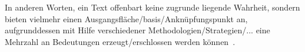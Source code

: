In anderen Worten, ein Text offenbart keine zugrunde liegende Wahrheit, sondern bieten vielmehr einen Ausgangsfläche/basis/Anknüpfungspunkt an, aufgrunddessen mit Hilfe verschiedener Methodologien/Strategien/... eine Mehrzahl an Bedeutungen erzeugt/erschlossen werden können~\cite{Beehler1988}.

\begin{comment}
[Beehler1988]
"Consequently, what we teach in the English class-
room is not "literature" but ways of reading. By
helping students to identify different methods,
different positions from which to view a work, we
help them to realize that texts do not "reveal"
truth: they simply provide the field upon which
meanings can be produced."
\end{comment}

\begin{comment}
  [Kolodny1980]
  feministische literaturkritik wird anscheinend zur sau gemacht, weil sie kein system/program hat: "lack of systematic coherence"
  das ist auch gleichzeitig die stärke der bewegung: diversity, pluralism
  ``All the feminist is asserting, then, is her own equivalent
  right to liberate new (and perhaps different) significances from
  these same texts; and, at the same time, her right to choose which
  features of a text she takes as relevant because she is, after all, ask-
  ing new and different questions of it.''~\cite{Kolodny1980}
  ``Robert Scholes, from whom I've been quoting, goes so far as to assert
  that "there is no single 'right' reading for any complex literary
  work,"''
  ``we entertain the possibility
  that different readings, even of the same text, may be differently
  useful, even illuminating, within different contexts of inquiry.''
  ``what we give up is simply the arrogance of
  claiming that our work is either exhaustive or definitive.''
  ``If feminist criticism calls anything into
  question, it must be that dog-eared myth of intellectual neutrality.''

Feministische Kritik stellt uns folgende Fragen:
- how are aesthetic values assigned
- do they reside with the reader or the text?
- what ends do the judgements serve?
- what value systems do they help perpetuate?

"What unites and repeatedly invigorates feminist literary criti-
cism, then, is neither dogma nor method but, as I have indicated
earlier, an acute and impassioned attentiveness to the ways in
which primarily male structures of power are inscribed (or en-
coded) within our literary inheritance; the consequences of that
encoding for women-as characters, as readers, and as writers;
and, with that, a shared analytic concern for the implications of
that encoding not only for a better understanding of the past, but
also for an improved reordering of the present and future as well."
-> Das ist meine Perspektive für die "feministischen Lektüren"

\end{comment}
